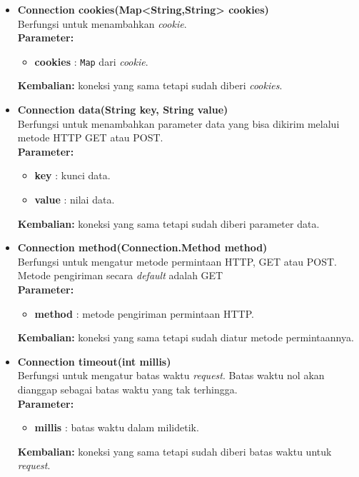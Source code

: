 \begin{itemize}
	\item \textbf{Connection cookies(Map<String,String> cookies)} \\
		Berfungsi untuk menambahkan \textit{cookie}. \\
		\textbf{Parameter:}
		\begin{itemize}
			\item \textbf{cookies} : \texttt{Map} dari \textit{cookie}.
		\end{itemize}
		\textbf{Kembalian:} koneksi yang sama tetapi sudah diberi \textit{cookies}.
		
		\item \textbf{Connection data(String key, String value)} \\
		Berfungsi untuk menambahkan parameter data yang bisa dikirim melalui metode HTTP GET atau POST. \\
		\textbf{Parameter:}
		\begin{itemize}
			\item \textbf{key} : kunci data.
			\item \textbf{value} : nilai data.
		\end{itemize}
		\textbf{Kembalian:} koneksi yang sama tetapi sudah diberi parameter data.
		
		\item \textbf{Connection method(Connection.Method method)} \\
		Berfungsi untuk mengatur metode permintaan HTTP, GET atau POST. Metode pengiriman secara \textit{default} adalah GET\\
		\textbf{Parameter:}
		\begin{itemize}
			\item \textbf{method} : metode pengiriman permintaan HTTP.
		\end{itemize}
		\textbf{Kembalian:} koneksi yang sama tetapi sudah diatur metode permintaannya.
		
		\item \textbf{Connection timeout(int millis)} \\
		Berfungsi untuk mengatur batas waktu \textit{request}. Batas waktu nol akan dianggap sebagai batas waktu yang tak terhingga. \\
		\textbf{Parameter:}
		\begin{itemize}
			\item \textbf{millis} : batas waktu dalam milidetik.
		\end{itemize}
		\textbf{Kembalian:} koneksi yang sama tetapi sudah diberi batas waktu untuk \textit{request}.
		

\end{itemize}

